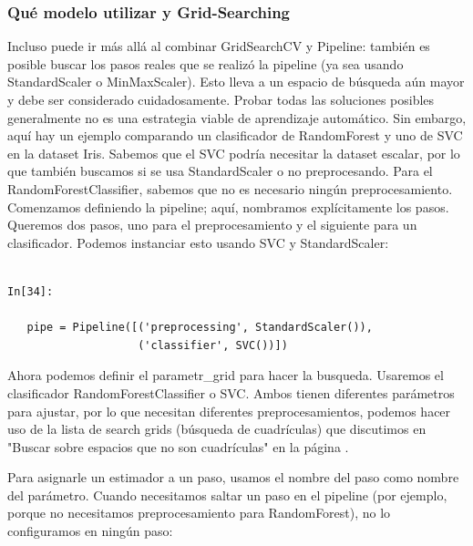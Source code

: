 	
	\subsubsection{Qué modelo utilizar y	Grid-Searching }
	

	
	Incluso puede ir más allá al combinar {\ttfamily GridSearchCV} y  {\ttfamily  Pipeline}: 
	también es posible  buscar  los pasos reales que se realizó la pipeline (ya sea usando {\ttfamily
		StandardScaler}  o   {\ttfamily MinMaxScaler}).
	Esto lleva a un espacio de búsqueda aún mayor y debe ser considerado cuidadosamente. Probar todas las soluciones posibles generalmente no es una estrategia viable de aprendizaje automático. 
	Sin embargo, aquí hay un ejemplo comparando un clasificador de {\ttfamily RandomForest}
	y uno de {\ttfamily  SVC} en la dataset Iris. Sabemos que el {\ttfamily  SVC} podría necesitar la dataset  escalar, por lo que también buscamos si se usa {\ttfamily  StandardScaler}  o no preprocesando.
	Para el {\ttfamily RandomForestClassifier}, sabemos que no es necesario ningún preprocesamiento.
	Comenzamos definiendo la pipeline; aquí, nombramos explícitamente los pasos. 
	Queremos dos pasos, uno para el preprocesamiento y el siguiente para un clasificador. Podemos instanciar esto 	usando {\ttfamily  SVC}  y  {\ttfamily  StandardScaler}:
		
	
	\begin{lstlisting}
	
In[34]:
   
   pipe = Pipeline([('preprocessing', StandardScaler()),
                    ('classifier', SVC())])   
   \end{lstlisting}
	
	
	Ahora podemos definir el  {\ttfamily  parametr\_grid} para hacer la busqueda. Usaremos el clasificador  {\ttfamily RandomForestClassifier} o {\ttfamily SVC}. Ambos tienen diferentes parámetros para ajustar, por lo que  necesitan diferentes preprocesamientos, podemos hacer uso de la lista de  search grids  (búsqueda de cuadrículas)  que discutimos en "{}Buscar sobre espacios que no son cuadrículas"{}  en la página  \pageref{Pagina1}.
	
	
	Para asignarle  un estimador a un paso, usamos el nombre del paso como nombre del parámetro. Cuando necesitamos  saltar un paso en el pipeline (por ejemplo, porque no necesitamos preprocesamiento para {\ttfamily RandomForest}), no lo configuramos en ningún paso:	
	
